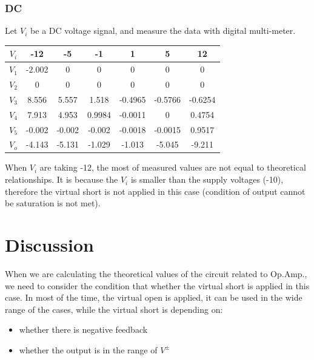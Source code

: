     \subsubsection{DC}
    Let $V_i$ be a DC voltage signal, and measure the data with digital multi-meter.\\
        \begin{table}[h]
        \centering
            \begin{tabular}{|c|c|c|c|c|c|c|}
            \hline
            $V_i$ & -12    & -5     & -1     & 1       & 5       & 12      \\ \hline
            $V_1$ & -2.002 & 0      & 0      & 0       & 0       & 0       \\ \hline
            $V_2$ & 0      & 0      & 0      & 0       & 0       & 0       \\ \hline
            $V_3$ & 8.556  & 5.557  & 1.518  & -0.4965 & -0.5766 & -0.6254 \\ \hline
            $V_4$ & 7.913  & 4.953  & 0.9984 & -0.0011 & 0       & 0.4754  \\ \hline
            $V_5$ & -0.002 & -0.002 & -0.002 & -0.0018 & -0.0015 & 0.9517  \\ \hline
            $V_o$ & -4.143 & -5.131 & -1.029 & -1.013  & -5.045  & -9.211  \\ \hline
        \end{tabular}
        \end{table}
        \FloatBarrier
    When $V_i$ are taking -12, the most of measured values are not equal to theoretical relationships. It is because the $V_i$ is smaller than the supply voltages (-10), therefore the virtual short is not applied in this case (condition of output cannot be saturation is not met).
\section{Discussion}
    When we are calculating the theoretical values of the circuit related to Op.Amp., we need to consider the condition that whether the virtual short is applied in this case. In most of the time, the virtual open is applied, it can be used in the wide range of the cases, while the virtual short is depending on:\\
        \begin{itemize}
            \item whether there is negative feedback
            \item whether the output is in the range of $V^\pm$
        \end{itemize}


